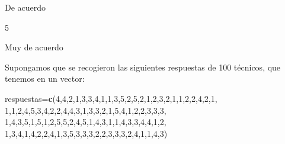 \documentclass[]{book}
\newenvironment{Shaded}{\begin{snugshade}}{\end{snugshade}}
\newcommand{\DecValTok}[1]{\textcolor[rgb]{0.00,0.00,0.81}{#1}}
\newcommand{\KeywordTok}[1]{\textcolor[rgb]{0.13,0.29,0.53}{\textbf{#1}}}
\newcommand{\NormalTok}[1]{#1}
\theoremstyle{definition}
\theoremstyle{definition}
\theoremstyle{definition}
\theoremstyle{remark}
\begin{document}
De acuerdo

5

Muy de acuerdo

Supongamos que se recogieron las siguientes respuestas de 100 técnicos, que tenemos en un vector:

\begin{Shaded}
\begin{Highlighting}[]
\NormalTok{respuestas=}\KeywordTok{c}\NormalTok{(}\DecValTok{4}\NormalTok{,}\DecValTok{4}\NormalTok{,}\DecValTok{2}\NormalTok{,}\DecValTok{1}\NormalTok{,}\DecValTok{3}\NormalTok{,}\DecValTok{3}\NormalTok{,}\DecValTok{4}\NormalTok{,}\DecValTok{1}\NormalTok{,}\DecValTok{1}\NormalTok{,}\DecValTok{3}\NormalTok{,}\DecValTok{5}\NormalTok{,}\DecValTok{2}\NormalTok{,}\DecValTok{5}\NormalTok{,}\DecValTok{2}\NormalTok{,}\DecValTok{1}\NormalTok{,}\DecValTok{2}\NormalTok{,}\DecValTok{3}\NormalTok{,}\DecValTok{2}\NormalTok{,}\DecValTok{1}\NormalTok{,}\DecValTok{1}\NormalTok{,}\DecValTok{2}\NormalTok{,}\DecValTok{2}\NormalTok{,}\DecValTok{4}\NormalTok{,}\DecValTok{2}\NormalTok{,}\DecValTok{1}\NormalTok{,}
             \DecValTok{1}\NormalTok{,}\DecValTok{1}\NormalTok{,}\DecValTok{2}\NormalTok{,}\DecValTok{4}\NormalTok{,}\DecValTok{5}\NormalTok{,}\DecValTok{3}\NormalTok{,}\DecValTok{4}\NormalTok{,}\DecValTok{2}\NormalTok{,}\DecValTok{2}\NormalTok{,}\DecValTok{4}\NormalTok{,}\DecValTok{4}\NormalTok{,}\DecValTok{3}\NormalTok{,}\DecValTok{1}\NormalTok{,}\DecValTok{3}\NormalTok{,}\DecValTok{3}\NormalTok{,}\DecValTok{2}\NormalTok{,}\DecValTok{1}\NormalTok{,}\DecValTok{5}\NormalTok{,}\DecValTok{4}\NormalTok{,}\DecValTok{1}\NormalTok{,}\DecValTok{2}\NormalTok{,}\DecValTok{2}\NormalTok{,}\DecValTok{3}\NormalTok{,}\DecValTok{3}\NormalTok{,}\DecValTok{3}\NormalTok{,}
             \DecValTok{1}\NormalTok{,}\DecValTok{4}\NormalTok{,}\DecValTok{3}\NormalTok{,}\DecValTok{5}\NormalTok{,}\DecValTok{1}\NormalTok{,}\DecValTok{5}\NormalTok{,}\DecValTok{1}\NormalTok{,}\DecValTok{2}\NormalTok{,}\DecValTok{5}\NormalTok{,}\DecValTok{5}\NormalTok{,}\DecValTok{2}\NormalTok{,}\DecValTok{4}\NormalTok{,}\DecValTok{5}\NormalTok{,}\DecValTok{1}\NormalTok{,}\DecValTok{4}\NormalTok{,}\DecValTok{3}\NormalTok{,}\DecValTok{1}\NormalTok{,}\DecValTok{1}\NormalTok{,}\DecValTok{4}\NormalTok{,}\DecValTok{3}\NormalTok{,}\DecValTok{3}\NormalTok{,}\DecValTok{4}\NormalTok{,}\DecValTok{4}\NormalTok{,}\DecValTok{1}\NormalTok{,}\DecValTok{2}\NormalTok{,}
             \DecValTok{1}\NormalTok{,}\DecValTok{3}\NormalTok{,}\DecValTok{4}\NormalTok{,}\DecValTok{1}\NormalTok{,}\DecValTok{4}\NormalTok{,}\DecValTok{2}\NormalTok{,}\DecValTok{2}\NormalTok{,}\DecValTok{4}\NormalTok{,}\DecValTok{1}\NormalTok{,}\DecValTok{3}\NormalTok{,}\DecValTok{5}\NormalTok{,}\DecValTok{3}\NormalTok{,}\DecValTok{3}\NormalTok{,}\DecValTok{3}\NormalTok{,}\DecValTok{2}\NormalTok{,}\DecValTok{2}\NormalTok{,}\DecValTok{3}\NormalTok{,}\DecValTok{3}\NormalTok{,}\DecValTok{3}\NormalTok{,}\DecValTok{2}\NormalTok{,}\DecValTok{4}\NormalTok{,}\DecValTok{1}\NormalTok{,}\DecValTok{1}\NormalTok{,}\DecValTok{4}\NormalTok{,}\DecValTok{3}\NormalTok{)}
\end{Highlighting}
\end{Shaded}
\end{document}
